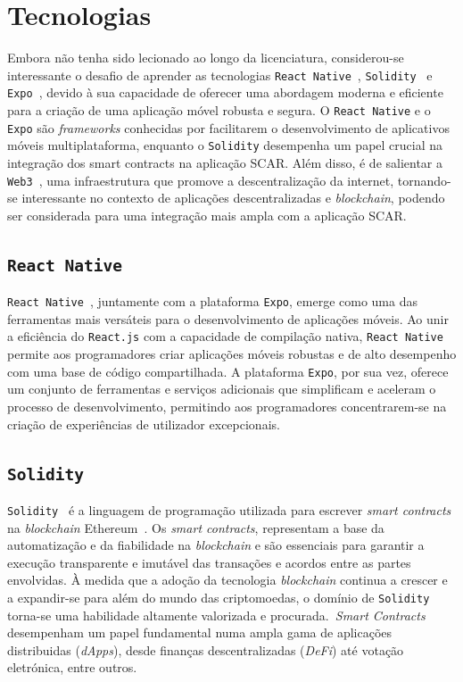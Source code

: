 \documentclass[10pt]{article}
\begin{document}
\section*{Tecnologias}

Embora não tenha sido lecionado ao longo da licenciatura, considerou-se interessante o desafio de aprender
as tecnologias \texttt{React Native}~\cite{ReactNativeBook}, \texttt{Solidity}~\cite{SolidityBook} e \texttt{Expo}~\cite{Expo},
devido à sua capacidade de oferecer uma abordagem moderna e eficiente para a criação de uma aplicação móvel robusta e segura.
O \texttt{React Native} e o \texttt{Expo} são \textit{frameworks} conhecidas por facilitarem o desenvolvimento de aplicativos móveis multiplataforma, 
enquanto o \texttt{Solidity} desempenha um papel crucial na integração dos smart contracts na aplicação SCAR\@.
Além disso, é de salientar a \texttt{Web3}~\cite{Web3}, uma infraestrutura que promove a descentralização da internet, tornando-se interessante no contexto de
aplicações descentralizadas e \textit{blockchain}, podendo ser considerada para uma integração mais ampla com a aplicação SCAR\@.

\subsection*{\texttt{React Native}}

\texttt{React Native}~\cite{ReactNativeDocs}, juntamente com a plataforma \texttt{Expo}, emerge como uma das ferramentas mais versáteis
para o desenvolvimento de aplicações móveis. Ao unir a eficiência do \texttt{React.js} com a capacidade de compilação
nativa, \texttt{React Native} permite aos programadores criar aplicações móveis robustas e de alto desempenho
com uma base de código compartilhada. A plataforma \texttt{Expo}, por sua vez, oferece um conjunto de ferramentas
e serviços adicionais que simplificam e aceleram o processo de desenvolvimento, permitindo aos programadores
concentrarem-se na criação de experiências de utilizador excepcionais.

\subsection*{\texttt{Solidity}}

\texttt{Solidity}~\cite{SolidityDocs} é a linguagem de programação utilizada para escrever \textit{smart contracts} na \textit{blockchain} Ethereum~\cite{Ethereum}.
Os \textit{smart contracts}, representam a base da automatização e da fiabilidade na \textit{blockchain} e são essenciais
para garantir a execução transparente e imutável das transações e acordos entre as partes envolvidas.
À medida que a adoção da tecnologia \textit{blockchain} continua a crescer e a expandir-se para além do mundo das criptomoedas, o domínio de \texttt{Solidity} torna-se
uma habilidade altamente valorizada e procurada.\ \textit{Smart Contracts} desempenham um papel fundamental numa
ampla gama de aplicações distribuidas (\textit{dApps}), desde finanças descentralizadas (\textit{DeFi}) até votação eletrónica, entre outros.
\end{document}
